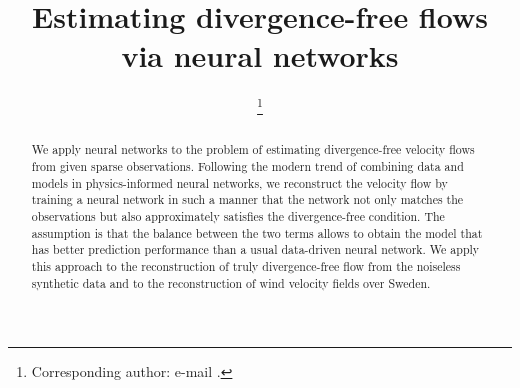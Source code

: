 \documentclass[pamm,a4paper,fleqn]{w-art}
\begin{document}

\TitleLanguage[EN]
\title[Divergence-free neural networks]{Estimating divergence-free flows via
  neural networks}

\author{ %
\footnote{Corresponding author:
  e-mail .}} 
\author{ }
\author{ }
\author{ }

\address[\inst{1}]{\CountryCode[DE]RWTH Aachen University, Pontdriesch 14--16,
  Aachen 52062, Germany}
\address[\inst{2}]{\CountryCode[SE]KTH Royal Institute of Technology,
  SE-100 44 Stockholm, Sweden}
\address[\inst{3}]{\CountryCode[SA]King Abdullah University of Science and
  Technology, Thuwal, 23955-6900, Saudi Arabia}
\AbstractLanguage[EN]
\begin{abstract}
We apply neural networks to the problem of estimating divergence-free velocity
flows from given sparse observations.
Following the modern trend of combining data and models in
physics-informed neural networks, we reconstruct the velocity flow
by training a neural network in such a manner that the network not
only matches the observations but also approximately satisfies the
divergence-free condition.
The assumption is that the balance between the two terms allows
to obtain the model that has better prediction performance than a usual
data-driven neural network.
We apply this
approach to the reconstruction of truly divergence-free flow from the noiseless
synthetic data and to the reconstruction of wind velocity fields over Sweden.
\end{abstract}
\maketitle                   %
\end{document}
